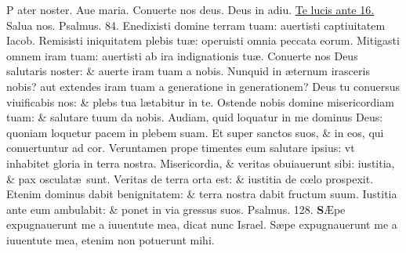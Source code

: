 \documentclass[a5paper,10pt]{book}
\def\ae{æ}
\def\AE{Æ}
\def\oe{œ}
\begin{document}
\begin{multicols*}{2}
\par \noindent \color{red} P\color{black} ater noster. Aue maria. Conuerte nos deus. Deus in adiu. \hyperlink{Telucis}{Te lucis ante 16.} Salua nos. \color{red} Psalmus. \hypertarget{ps84}{84.} \color{black}
Enedixisti domine terram tuam: auertisti captiuitatem Iacob.
\newline \color{red} R\color{black}emisisti iniquitatem plebis tu\ae : operuisti omnia peccata eorum.
\newline \color{red} M\color{black}itigasti omnem iram tuam: auertisti ab ira indignationis tu\ae .
\newline \color{red} C\color{black}onuerte nos Deus salutaris noster: \& auerte iram tuam a nobis.
\newline \color{red} N\color{black}unquid in \ae ternum irasceris nobis? aut extendes iram tuam a generatione in generationem?
\newline \color{red} D\color{black}eus tu conuersus viuificabis nos: \& plebs tua l\ae tabitur in te.
\newline \color{red} O\color{black}stende nobis domine misericordiam tuam: \& salutare tuum da nobis.
\newline \color{red} A\color{black}udiam, quid loquatur in me dominus Deus: quoniam loquetur pacem in plebem suam.
\newline \color{red} E\color{black}t super sanctos suos, \& in eos, qui conuertuntur ad cor.
\newline \color{red} V\color{black}eruntamen prope timentes eum salutare ipsius: vt inhabitet gloria in terra nostra.
\newline \color{red} M\color{black}isericordia, \& veritas obuiauerunt sibi: iustitia, \& pax osculat\ae \ sunt.
\newline \color{red} V\color{black}eritas de terra orta est: \& iustitia de c\oe lo prospexit.
\newline \color{red} E\color{black}tenim dominus dabit benignitatem: \& terra nostra dabit fructum suum.
\newline \color{red} I\color{black}ustitia ante eum ambulabit: \& ponet in via gressus suos. \quad \color{red} Psalmus. \hypertarget{ps128}{128.} \color{black}
\vspace{-.25em}
\lettrine[lines=2]{\bfseries \color{red} S}{}\AE pe expugnauerunt me a iuuentute mea, dicat nunc Israel.
\newline \color{red} S\color{black}\ae pe expugnauerunt me a iuuentute mea, etenim non potuerunt mihi.

\end{multicols*}
\end{document}
